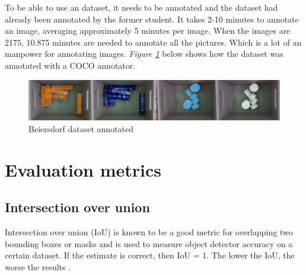 To be able to use an dataset, it needs to be annotated and the dataset had already been annotated by the former student. It takes 2-10 minutes to annotate an image, averaging approximately 5 minutes per image. When the images are 2175, 10.875 minutes are needed to annotate all the pictures. Which is a lot of an manpower for annotating images. \textit{Figure \ref{fig:beiersdorfanno}} below shows how the dataset was annotated with a COCO annotator\cite{brooks_jsbrokscoco-annotator_2021}.
\begin{figure}[h]
    \centering
    \includegraphics[width=1\textwidth,  angle =0]{graphics/methods/sverrirannotated.PNG}
    \caption{Beiersdorf dataset annotated\cite{bjarnason_1984-_detecting_2021}}
    \label{fig:beiersdorfanno}
\end{figure}

\section{Evaluation metrics}
\subsection{Intersection over union}
Intersection over union (IoU) is known to be a good metric for overlapping two bounding boxes or masks and is used to measure object detector accuracy on a certain dataset. If the estimate is correct, then IoU = 1. The lower the IoU, the worse the results \cite{sheremet_intersection_2020}.

